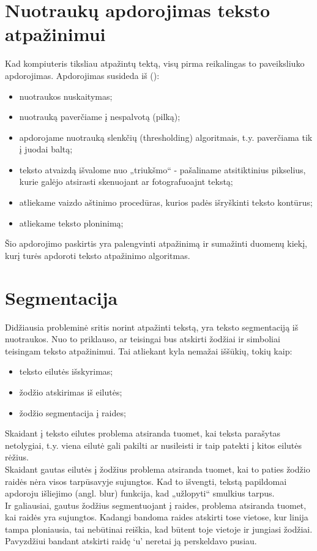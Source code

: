 \documentclass[a4paper,12pt]{article}
\begin{document}
\section{Nuotraukų apdorojimas teksto atpažinimui}
Kad kompiuteris tiksliau atpažintų tektą, visų pirma reikalingas to paveiksliuko apdorojimas. Apdorojimas susideda iš  (\cite{KavaliauskasFelinskas, Beigi}):
\begin{itemize}
	\item nuotraukos nuskaitymas;
	\item nuotrauką paverčiame į nespalvotą (pilką);
	\item apdorojame nuotrauką slenkčių (thresholding) algoritmais, t.y. paverčiama tik į juodai baltą;
	\item teksto atvaizdą išvalome nuo „triukšmo“ - pašaliname atsitiktinius pikselius, kurie galėjo atsirasti skenuojant ar fotografuoajnt tekstą;
	\item atliekame vaizdo aštinimo procedūras, kurios padės išryškinti teksto kontūrus;
	\item atliekame teksto ploninimą;
\end{itemize}
Šio apdorojimo paskirtis yra palengvinti atpažinimą ir sumažinti duomenų kiekį, kurį turės apdoroti teksto atpažinimo algoritmas.
\section{Segmentacija}
Didžiausia probleminė sritis norint atpažinti tekstą, yra teksto segmentaciją iš nuotraukos. Nuo to priklauso, ar teisingai bus atskirti žodžiai ir simboliai teisingam teksto atpažinimui. Tai atliekant kyla nemažai iššūkių, tokių kaip: 
\begin{itemize}
	\item teksto eilutės išskyrimas;
	\item žodžio atskirimas iš eilutės;
	\item žodžio segmentacija į raides;
\end{itemize}
\indent Skaidant į teksto eilutes  problema atsiranda tuomet, kai teksta parašytas netolygiai, t.y. viena eilutė gali pakilti ar nusileisti ir taip patekti į kitos eilutės rėžius. \\
\indent Skaidant gautas eilutės į žodžius problema atsiranda tuomet, kai to paties žodžio raidės nėra visos tarpūsavyje sujungtos. Kad to išvengti, tekstą papildomai apdoroju išliejimo (angl. blur) funkcija, kad „užlopyti“ smulkius tarpus.\\
\indent Ir galiausiai, gautus žodžius segmentuojant į raides, problema atsiranda tuomet, kai raidės yra sujungtos. Kadangi bandoma raides atskirti tose vietose, kur linija tampa ploniausia, tai nebūtinai reiškia, kad būtent toje vietoje ir jungiasi žodžiai. Pavyzdžiui bandant atskirti raidę `u' neretai ją perskeldavo pusiau.
\end{document}
